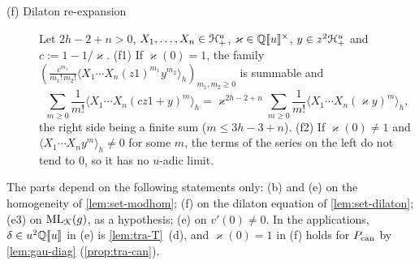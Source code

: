 \begin{lem}
\begin{description}
\item[(f) Dilaton re-expansion] Let $2h-2+n>0$, $X_1,\dots,X_n\in\mathcal{H}^u_+$, $\varkappa\in\mathbb{Q}[\![ u ]\!]^\times$, $y\in z^2\mathcal{H}^u_+$ and $c := 1-1/\varkappa$. (f1) If $\varkappa(0) = 1$, the family $(\frac{c^{m_1}}{m_1!\,m_2!}\langle X_1\cdots X_n(z1)^{m_1}y^{m_2}\rangle_h)_{m_1,m_2\geq 0}$ is summable and
\[
\sum_{m\geq 0}\frac1{m!}\langle X_1\cdots X_n(cz1+y)^m\rangle_h = \varkappa^{2h-2+n}\sum_{m\geq 0}\frac1{m!}\langle X_1\cdots X_n(\varkappa y)^m\rangle_h ,
\]
the right side being a finite sum ($m\leq 3h-3+n$). (f2) If $\varkappa(0)\neq 1$ and $\langle X_1\cdots X_ny^{m}\rangle_h\neq 0$ for some $m$, the terms of the series on the left do not tend to $0$, so it has no $u$-adic limit.
\end{description}
The parts depend on the following statements only: (b) and (e) on the homogeneity of \cref{lem:set-modhom}; (f) on the dilaton equation of \cref{lem:set-dilaton}; (e3) on $\mathrm{ML}_{\mathcal{K}}(g)$, as a hypothesis; (e) on $v'(0)\neq 0$. In the applications, $\delta\in u^2\mathbb{Q}[\![ u ]\!]$ in (e) is \cref{lem:tra-T}~(d), and $\varkappa(0) = 1$ in (f) holds for $P_{\mathrm{can}}$ by \cref{lem:gau-diag} (\cref{prop:tra-can}).
\end{lem}

